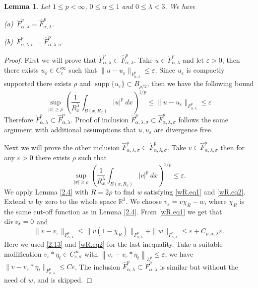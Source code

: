 \documentclass[11pt]{article}
\numberwithin{equation}{section}
\newtheorem{lem}[thm]{Lemma}
\theoremstyle{remark}
\theoremstyle{definition}
\newcommand{\bke}[1]{\left ( #1 \right )}
\newcommand{\norm}[1]{\left \| #1 \right \|}
\newcommand{\R}{\mathbb{R}}
\renewcommand{\div}{\mathop{\rm div}\nolimits}
\newcommand{\si}{\sigma}
\newcommand\al{\alpha}
\newcommand\e {\varepsilon}  %
\newcommand\la{\lambda}
\newcommand{\supp} {\mathop{\mathrm{supp}}}
\newcommand{\EQ}[1]{\begin{equation} #1 \end{equation}}
\begin{document}
\begin{lem}\label{F_hatspaces}
Let $1\le p<\infty$, $0 \le \al \le 1$ and $0 \le \la < 3$.
%
%
%
We have

\textup{(a)}\   $\mathring{F}^p_{\al,\la}=\hat{F}^p_{\al,\la}$.

\textup{(b)}\ $\mathring{F}^p_{\al,\la,\sigma}=\hat{F}^p_{\al,\la,\sigma}$.

\end{lem}
\begin{proof}
  First we will prove that $\mathring{F}^p_{\al,\la}\subset\hat{F}^p_{\al,\la}$. Take $u\in \mathring{F}^p_{\al,\la}$ and let $\varepsilon>0$, then there exists $u_{\varepsilon}\in C^{\infty}_c$ such that $\|u-u_{\varepsilon}\|_{F^p_{\al,\la}}\le\varepsilon$. Since $u_{\varepsilon}$ is compactly supported there exists $\rho$ and $\supp\{u_{\varepsilon}\}\subset B_{\rho/2}$, then we have the following bound
  \EQ{
  \underset{|x|\ge\rho}\sup\bke{\frac{1}{R_x^\la}\int_{B(x,R_x)}|u|^p~dx}^{1/p}\le  \|u-u_{\varepsilon}\|_{F^p_{\al,\la}}\le\varepsilon
  }
Therefore $\mathring{F}^p_{\al,\la}\subset\hat{F}^p_{\al,\la}$. Proof of inclusion $\mathring{F}^p_{\al,\la,\sigma}\subset\hat{F}^p_{\al,\la,\sigma}$ follows the same argument with additional assumptions that $u,u_{\varepsilon}$ are divergence free.

Next we will prove the other inclusion $\hat{F}^p_{\al,\la,\sigma}\subset\mathring{F}^p_{\al,\la,\sigma}$.
%
%
%
%
%
%
%
%
%
%
%
  Take $v\in \hat{F}^p_{\al,\la,\sigma}$ then for any $\varepsilon>0$ there exists $\rho$ such that
   \EQ{\label{2.13}
  \underset{|x|\ge \rho}\sup\bke{\frac{1}{R_x^\la}\int_{B(x,R_x)}|v|^p~dx}^{1/p}\le\varepsilon.
  }
  We apply Lemma \ref{2.4} with $R=2\rho$ to find $w$ satisfying \eqref{wR.eq1} and \eqref{wR.eq2}.
Extend $w$ by zero to the whole space $\R^3$. We choose $v_{\varepsilon}=v\chi_R-w$, where $\chi_R$ is the same cut-off function as in Lemma \ref{2.4}. From \eqref{wR.eq1} we get that $\div v_{\varepsilon}=0$ and
%
%
%
%
%
%
\[
\|v-v_{\varepsilon}\|_{F^p_{\al,\la}}\le  \|v(1-\chi_R)\|_{F^p_{\al,\la}} +   \|w\|_{F^p_{\al,\la}}
\le \e + C_{p,\al,\la}\varepsilon.
\]
Here we used \eqref{2.13} and \eqref{wR.eq2} for the last inequality. Take a suitable mollification $v_\e * \eta_t \in C^\infty_{c,\si}$ with $\norm{v_\e -v_\e * \eta_t }_{L^p} \le \e$, we have $\|v-v_{\varepsilon}* \eta_t \|_{F^p_{\al,\la}}\le C\e$. The inclusion
$\hat{F}^p_{\al,\la}\subset\mathring{F}^p_{\al,\la}$ is similar but without the need of $w$, and is skipped.
\end{proof}
\end{document}
